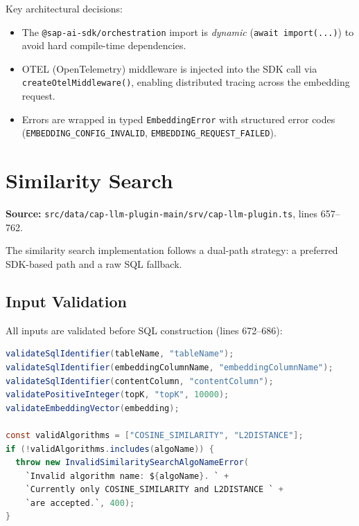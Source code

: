 \documentclass[11pt]{article}
\begin{document}
Key architectural decisions:
\begin{itemize}
  \item The \texttt{@sap-ai-sdk/orchestration} import is \emph{dynamic}
        (\texttt{await import(...)}) to avoid hard compile-time dependencies.
  \item OTEL (OpenTelemetry) middleware is injected into the SDK call via
        \texttt{createOtelMiddleware()}, enabling distributed tracing across
        the embedding request.
  \item Errors are wrapped in typed \texttt{EmbeddingError} with structured
        error codes (\texttt{EMBEDDING\_CONFIG\_INVALID},
        \texttt{EMBEDDING\_REQUEST\_FAILED}).
\end{itemize}

\section{Similarity Search}
\label{sec:similarity-search}

\noindent\textbf{Source:}
\texttt{src/data/cap-llm-plugin-main/srv/cap-llm-plugin.ts}, lines 657--762.

The similarity search implementation follows a dual-path strategy: a preferred
SDK-based path and a raw SQL fallback.

\subsection{Input Validation}

All inputs are validated before SQL construction (lines 672--686):

\begin{lstlisting}[language=Java,caption={Input validation --- lines 672--686}]
validateSqlIdentifier(tableName, "tableName");
validateSqlIdentifier(embeddingColumnName, "embeddingColumnName");
validateSqlIdentifier(contentColumn, "contentColumn");
validatePositiveInteger(topK, "topK", 10000);
validateEmbeddingVector(embedding);

const validAlgorithms = ["COSINE_SIMILARITY", "L2DISTANCE"];
if (!validAlgorithms.includes(algoName)) {
  throw new InvalidSimilaritySearchAlgoNameError(
    `Invalid algorithm name: ${algoName}. ` +
    `Currently only COSINE_SIMILARITY and L2DISTANCE ` +
    `are accepted.`, 400);
}
\end{lstlisting}
\end{document}
